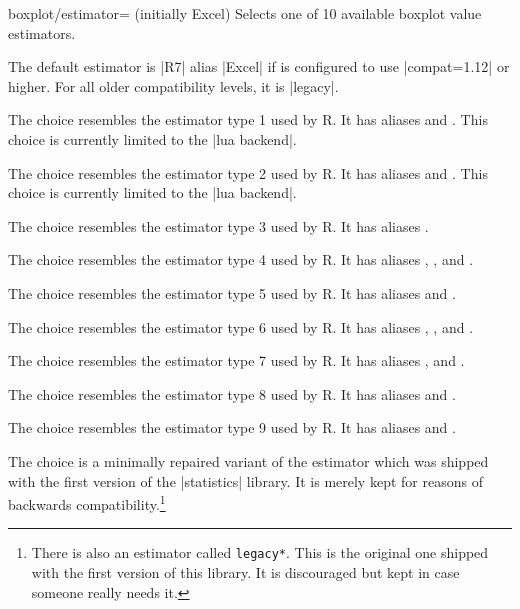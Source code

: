\begin{pgfplotskey}{boxplot/estimator= (initially Excel)}
    Selects one of 10 available boxplot value estimators.

    The default estimator is |R7| alias |Excel| if \PGFPlots{} is configured to
    use |compat=1.12| or higher. For all older compatibility levels, it is
    |legacy|.

    The choice  resembles the estimator type 1 used by R. It
    has aliases  and . This choice is
    currently limited to the |lua backend|.

    The choice  resembles the estimator type 2 used by R. It
    has aliases  and . This choice is
    currently limited to the |lua backend|.

    The choice  resembles the estimator type 3 used by R. It
    has aliases .

    The choice  resembles the estimator type 4 used by R. It
    has aliases , , and
    .

    The choice  resembles the estimator type 5 used by R. It
    has aliases  and .

    The choice  resembles the estimator type 6 used by R. It
    has aliases , , and
    .

    The choice  resembles the estimator type 7 used by R. It
    has aliases ,  and
    .

    The choice  resembles the estimator type 8 used by R. It
    has aliases  and .

    The choice  resembles the estimator type 9 used by R. It
    has aliases  and .

    The choice  is a minimally repaired variant of the
    estimator which was shipped with the first version of the |statistics|
    library. It is merely kept for reasons of backwards
    compatibility.\footnote{There is also an estimator called \texttt{legacy*}.
    This is the original one shipped with the first version of this library. It
    is discouraged but kept in case someone really needs it.}
\end{pgfplotskey}

